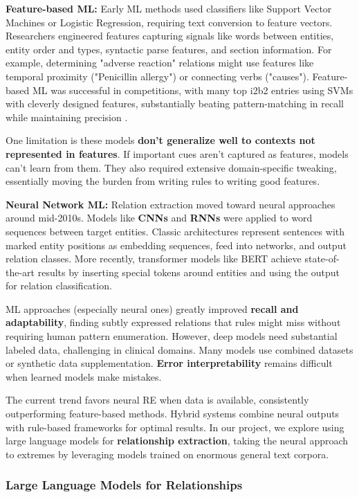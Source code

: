 \textbf{Feature-based ML:} Early ML methods used classifiers like Support Vector Machines or Logistic Regression, requiring text conversion to feature vectors. Researchers engineered features capturing signals like words between entities, entity order and types, syntactic parse features, and section information. For example, determining "adverse reaction" relations might use features like temporal proximity ("Penicillin allergy") or connecting verbs ("causes"). Feature-based ML was successful in competitions, with many top i2b2 entries using SVMs with cleverly designed features, substantially beating pattern-matching in recall while maintaining precision \parencite{Laue2024}.

One limitation is these models \textbf{don't generalize well to contexts not represented in features}. If important cues aren't captured as features, models can't learn from them. They also required extensive domain-specific tweaking, essentially moving the burden from writing rules to writing good features.

\textbf{Neural Network ML:} Relation extraction moved toward neural approaches around mid-2010s. Models like \textbf{CNNs} and \textbf{RNNs} were applied to word sequences between target entities. Classic architectures represent sentences with marked entity positions as embedding sequences, feed into networks, and output relation classes. More recently, transformer models like BERT achieve state-of-the-art results by inserting special tokens around entities and using the output for relation classification.

ML approaches (especially neural ones) greatly improved \textbf{recall and adaptability}, finding subtly expressed relations that rules might miss without requiring human pattern enumeration. However, deep models need substantial labeled data, challenging in clinical domains. Many models use combined datasets or synthetic data supplementation. \textbf{Error interpretability} remains difficult when learned models make mistakes.

The current trend favors neural RE when data is available, consistently outperforming feature-based methods. Hybrid systems combine neural outputs with rule-based frameworks for optimal results. In our project, we explore using large language models for \textbf{relationship extraction}, taking the neural approach to extremes by leveraging models trained on enormous general text corpora.

\subsubsection{Large Language Models for Relationships}

